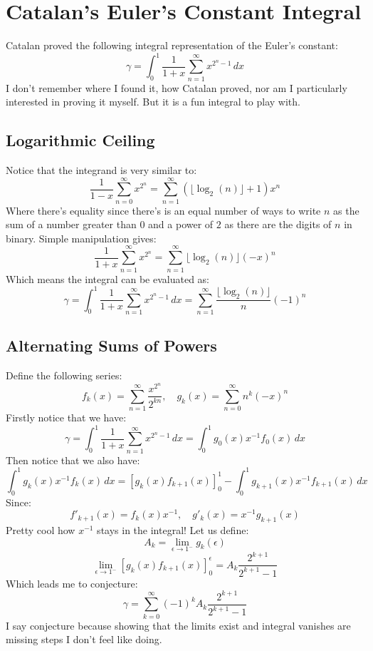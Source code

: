 
\section{Catalan's Euler's Constant Integral}
Catalan proved the following integral representation of the Euler's constant:
\[\gamma = \int_{0}^{1}\frac{1}{1+x}\sum_{n=1}^{\infty}x^{2^n-1}\,dx\]
I don't remember where I found it,
how Catalan proved,
nor am I particularly interested in proving it myself.
But it is a fun integral to play with.

\subsection{Logarithmic Ceiling}
Notice that the integrand is very similar to:
\[\frac{1}{1-x}\sum_{n=0}^{\infty}x^{2^n}=\sum_{n=1}^{\infty}(\lfloor\log_2(n)\rfloor+1)x^n\]
Where there's equality since there's is an equal  number of ways to write $n$ as the sum of a number greater than $0$ and a power of $2$ as there are the digits of $n$ in binary.
Simple manipulation gives:
\[\frac{1}{1+x}\sum_{n=1}^{\infty}x^{2^n}=\sum_{n=1}^{\infty}\lfloor\log_2(n)\rfloor(-x)^n\]
Which means the integral can be evaluated as:
\[\gamma = \int_{0}^{1}\frac{1}{1+x}\sum_{n=1}^{\infty}x^{2^n-1}\,dx = \sum_{n=1}^\infty\frac{\lfloor\log_2(n)\rfloor}{n}(-1)^n\]

\subsection{Alternating Sums of Powers}
Define the following series:
\[f_k(x) = \sum_{n=1}^{\infty}\frac{x^{2^n}}{2^{kn}},\quad g_k(x) = \sum_{n=0}^{\infty}n^k(-x)^n\]
Firstly notice that we have:
\[\gamma = \int_{0}^{1}\frac{1}{1+x}\sum_{n=1}^{\infty}x^{2^n-1}\,dx = \int_{0}^{1}g_0(x)x^{-1}f_0(x)\,dx\]
Then notice that we also have:
\[\int_{0}^{1}g_k(x)x^{-1}f_k(x)\,dx =\left[g_k(x)f_{k+1}(x)\right]_{0}^{1}-\int_0^1g_{k+1}(x)x^{-1}f_{k+1}(x)\,dx\]
Since:
\[f'_{k+1}(x) = f_k(x)x^{-1},\quad g'_k(x) = x^{-1}g_{k+1}(x)\]
Pretty cool how $x^{-1}$ stays in the integral!
Let us define:
\[A_k = \lim_{\epsilon\rightarrow 1^-}g_k(\epsilon)\]
\[\lim_{\epsilon\rightarrow 1^-}\left[g_k(x)f_{k+1}(x)\right]_{0}^{\epsilon} = A_k\frac{2^{k+1}}{2^{k+1}-1}\]
Which leads me to conjecture:
\[\gamma = \sum_{k=0}^{\infty}(-1)^kA_k\frac{2^{k+1}}{2^{k+1}-1}\]
I say conjecture because showing that the limits exist and integral vanishes are missing steps I don't feel like doing.
